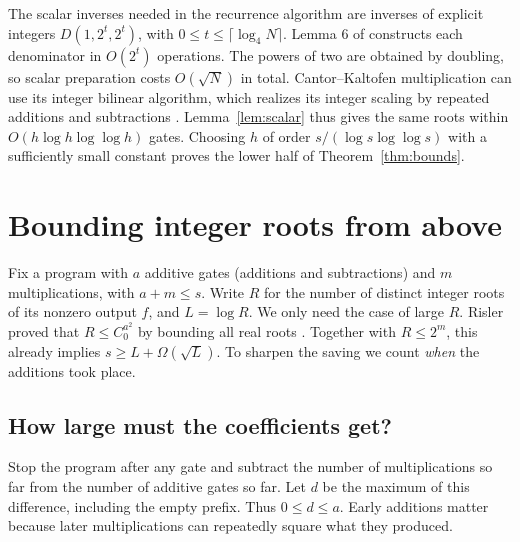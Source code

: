\documentclass[11pt,letterpaper]{article}
\begin{document}
The scalar inverses needed in the recurrence algorithm are inverses of
explicit integers \(D(1,2^t,2^t)\), with \(0\le t\le\lceil\log_4 N\rceil\).
Lemma 6 of \cite{BGS} constructs each denominator in \(O(2^t)\) operations.
The powers of two are obtained by doubling, so scalar preparation costs
\(O(\sqrt N)\) in total. Cantor--Kaltofen multiplication can use its
integer bilinear algorithm, which realizes its integer scaling by repeated additions and subtractions
\cite{CK}. Lemma~\ref{lem:scalar} thus gives the same roots within
\(O(h\log h\log\log h)\) gates. Choosing \(h\) of order
\(s/(\log s\log\log s)\) with a sufficiently small constant proves the
lower half of Theorem~\ref{thm:bounds}.

\clearpage
\section{Bounding integer roots from above}\label{sec:upper}
Fix a program with \(a\) additive gates (additions and subtractions) and
\(m\) multiplications, with \(a+m\le s\). Write \(R\) for the number of
distinct integer roots of its nonzero output \(f\), and \(L=\log R\).
We only need the case of large \(R\).
Risler proved that \(R\le C_0^{a^2}\) by bounding all real roots
\cite{Risler}. Together with \(R\le 2^m\), this already implies
\(s\ge L+\Omega(\sqrt L)\). To sharpen the saving we count \emph{when}
the additions took place.

\subsection{How large must the coefficients get?}
Stop the program after any gate and subtract the number of multiplications
so far from the number of additive gates so far. Let \(d\) be the
maximum of this difference, including the empty prefix. Thus \(0\le d\le a\).
Early additions matter because later multiplications can repeatedly square
what they produced.
\end{document}
